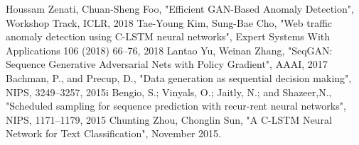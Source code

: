 \documentclass{acmtog} %
\begin{document}
\vfill
\vfill
\vfill
\vfill


\begin{thebibliography}{5}
	 Houssam Zenati, Chuan-Sheng Foo, "Efficient GAN-Based Anomaly Detection", Workshop Track, ICLR, 2018
	 Tae-Young Kim, Sung-Bae Cho, "Web traffic anomaly detection using C-LSTM neural networks", Expert Systems With Applications 106 (2018) 66–76, 2018
	 Lantao Yu, Weinan Zhang, "SeqGAN: Sequence Generative Adversarial Nets with Policy Gradient", AAAI, 2017
	 Bachman, P., and Precup, D., "Data generation as sequential decision making", NIPS, 3249–3257, 2015i
	 Bengio, S.; Vinyals, O.; Jaitly, N.; and Shazeer,N., "Scheduled sampling for sequence prediction with recur-rent neural networks", NIPS, 1171–1179, 2015
	 Chunting Zhou, Chonglin Sun, "A C-LSTM Neural Network for Text Classification", November 2015.
\end{thebibliography}
%
%
\end{document}
